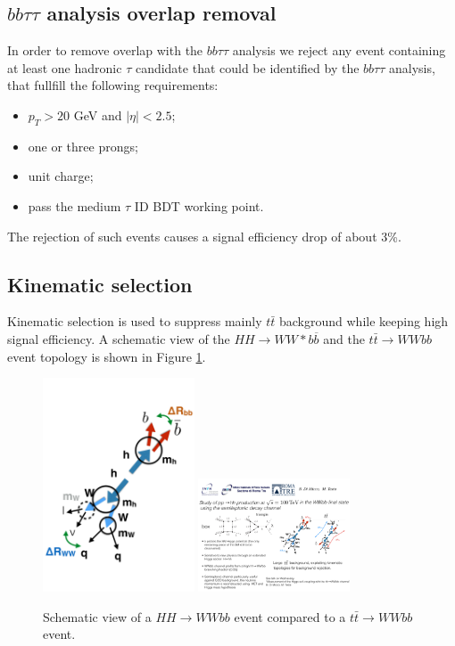 \subsection{$bb\tau\tau$ analysis overlap removal}
In order to remove overlap with the $bb\tau \tau$ analysis we reject
any event containing at least one hadronic $\tau$ candidate that could be
identified by the $bb\tau\tau$ analysis, that fullfill the following
requirements:
\begin{itemize}
\item $p_T > 20$ GeV and $|\eta| < 2.5$;
\item one or three prongs;
\item unit charge;
\item pass the medium $\tau$ ID BDT working point.
\end{itemize}

The rejection of such events causes a signal efficiency drop of about 3\%.

\subsection{Kinematic selection}
\label{subsec:kincuts}


Kinematic selection is used to suppress mainly $t\bar{t}$ background while keeping
high signal efficiency.  A schematic view of the $HH \to WW{*}b\overline{b}$ and the
$t \bar{t} \to WWbb$ event topology is shown in Figure \ref{fig:cartoon}.
\begin{figure}
\includegraphics[width=0.4\textwidth]{figures/cartoon_hh.pdf}
\includegraphics[width=0.4\textwidth]{figures/cartoon_tt.pdf}
\caption[Comparison signal and \ttbar events]{Schematic view of a $HH \to WWbb$ event compared to a $t\bar{t} \to WWbb$ event.} 
\label{fig:cartoon}
\end{figure}

